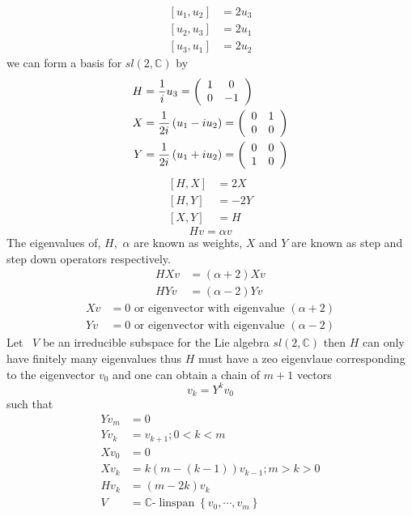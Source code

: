 \documentclass[aps,preprint]{revtex4}%
\begin{document}
\begin{align}
\left[  u_{1},u_{2}\right]   &  =2u_{3}\\
\left[  u_{2},u_{3}\right]   &  =2u_{1}\\
\left[  u_{3},u_{1}\right]   &  =2u_{2}%
\end{align}
we can form a basis for $sl\left(  2,\mathbb{C}\right)  $ by
\begin{align}
H  &  =\frac{1}{i}u_{3}=\left(
\begin{array}
[c]{cc}%
1 & 0\\
0 & -1
\end{array}
\right) \\
X  &  =\frac{1}{2i}\left(  u_{1}-iu_{2}\right)  =\left(
\begin{array}
[c]{cc}%
0 & 1\\
0 & 0
\end{array}
\right) \\
Y  &  =\frac{1}{2i}\left(  u_{1}+iu_{2}\right)  =\left(
\begin{array}
[c]{cc}%
0 & 0\\
1 & 0
\end{array}
\right)
\end{align}%
\begin{align}
\left[  H,X\right]   &  =2X\\
\left[  H,Y\right]   &  =-2Y\\
\left[  X,Y\right]   &  =H
\end{align}%
\begin{equation}
Hv=\alpha v
\end{equation}
The eigenvalues of, $H,$ $\alpha$ are known as weights, $X$ and $Y$ are known
as step and step down operators respectively.%
\begin{align}
HXv  &  =\left(  \alpha+2\right)  Xv\\
HYv  &  =\left(  \alpha-2\right)  Yv
\end{align}%
\begin{align}
Xv  &  =0\text{ or eigenvector with eigenvalue }\left(  \alpha+2\right) \\
Yv  &  =0\text{ or eigenvector with eigenvalue }\left(  \alpha-2\right)
\end{align}
Let \ $V$ be an irreducible subspace for the Lie algebra $sl\left(
2,\mathbb{C}\right)  $ then $H$ can only have finitely many eigenvalues thus
$H$ must have a zeo eigenvlaue corresponding to the eigenvector $v_{0}$ and
one can obtain a chain of $m+1$ vectors
\begin{equation}
v_{k}=Y^{k}v_{0}%
\end{equation}
such that
\begin{align}
Yv_{m}  &  =0\\
Yv_{k}  &  =v_{k+1};0<k<m\\
Xv_{0}  &  =0\\
Xv_{k}  &  =k\left(  m-\left(  k-1\right)  \right)  v_{k-1};m>k>0\\
Hv_{k}  &  =\left(  m-2k\right)  v_{k}\\
V  &  =\mathbb{C}\text{-}\operatorname*{linspan}\left\{  v_{0},\cdots
,v_{m}\right\}
\end{align}
\end{document}
